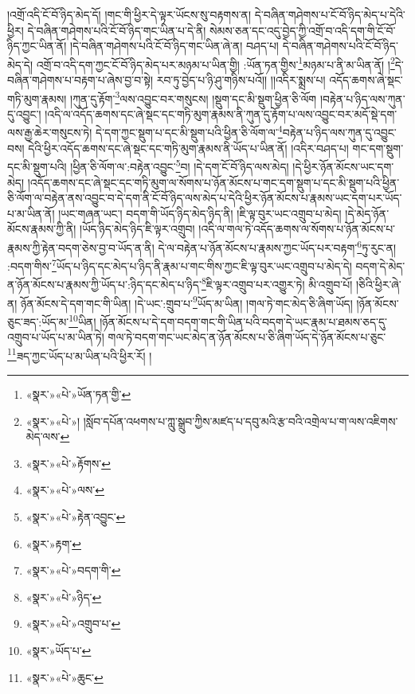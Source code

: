 །འགྲོ་འདི་ངོ་བོ་ཉིད་མེད་དོ། །གང་གི་ཕྱིར་དེ་ལྟར་ཡོངས་སུ་བརྟགས་ན། དེ་བཞིན་གཤེགས་པ་ངོ་བོ་ཉིད་མེད་པ་དེའི་ཕྱིར། དེ་བཞིན་གཤེགས་པའི་ངོ་བོ་ཉིད་གང་ཡིན་པ་དེ་ནི། སེམས་ཅན་དང་འདུ་བྱེད་ཀྱི་འགྲོ་བ་འདི་དག་གི་ངོ་བོ་ཉིད་ཀྱང་ཡིན་ནོ། །དེ་བཞིན་གཤེགས་པའི་ངོ་བོ་ཉིད་གང་ཡིན་ཞེ་ན། བཤད་པ། དེ་བཞིན་གཤེགས་པའི་ངོ་བོ་ཉིད་མེད་དེ། འགྲོ་བ་འདི་དག་ཀྱང་ངོ་བོ་ཉིད་མེད་པར་མཉམ་པ་ཡིན་གྱི། :ཡོན་ཏན་གྱིས་\footnote{«སྣར་»«པེ་»ཡོན་ཏན་གྱི་}མཉམ་པ་ནི་མ་ཡིན་ནོ། །\footnote{«སྣར་»«པེ་»། །སློབ་དཔོན་འཕགས་པ་ཀླུ་སྒྲུབ་ཀྱིས་མཛད་པ་དབུ་མའི་རྩ་བའི་འགྲེལ་པ་ག་ལས་འཇིགས་མེད་ལས་}དེ་བཞིན་གཤེགས་པ་བརྟག་པ་ཞེས་བྱ་བ་སྟེ། རབ་ཏུ་བྱེད་པ་ཉི་ཤུ་གཉིས་པའོ།། །།འདིར་སྨྲས་པ། འདོད་ཆགས་ཞེ་སྡང་གཏི་མུག་རྣམས། །ཀུན་དུ་རྟོག་\footnote{«སྣར་»«པེ་»རྟོགས་}ལས་འབྱུང་བར་གསུངས། །སྡུག་དང་མི་སྡུག་ཕྱིན་ཅི་ལོག །བརྟེན་པ་ཉིད་ལས་ཀུན་དུ་འབྱུང་། །འདི་ལ་འདོད་ཆགས་དང་ཞེ་སྡང་དང་གཏི་མུག་རྣམས་ནི་ཀུན་དུ་རྟོག་པ་ལས་འབྱུང་བར་མདོ་སྡེ་དག་ལས་རྒྱ་ཆེར་གསུངས་ཏེ། དེ་དག་ཀྱང་སྡུག་པ་དང་མི་སྡུག་པའི་ཕྱིན་ཅི་ལོག་ལ་\footnote{«སྣར་»«པེ་»ལས་}བརྟེན་པ་ཉིད་ལས་ཀུན་དུ་འབྱུང་བས། དེའི་ཕྱིར་འདོད་ཆགས་དང་ཞེ་སྡང་དང་གཏི་མུག་རྣམས་ནི་ཡོད་པ་ཡིན་ནོ། །འདིར་བཤད་པ། གང་དག་སྡུག་དང་མི་སྡུག་པའི། །ཕྱིན་ཅི་ལོག་ལ་:བརྟེན་འབྱུང་\footnote{«སྣར་»«པེ་»རྟེན་འབྱུང་}བ། །དེ་དག་ངོ་བོ་ཉིད་ལས་མེད། །དེ་ཕྱིར་ཉོན་མོངས་ཡང་དག་མེད། །འདོད་ཆགས་དང་ཞེ་སྡང་དང་གཏི་མུག་ལ་སོགས་པ་ཉོན་མོངས་པ་གང་དག་སྡུག་པ་དང་མི་སྡུག་པའི་ཕྱིན་ཅི་ལོག་ལ་བརྟེན་ནས་འབྱུང་བ་དེ་དག་ནི་ངོ་བོ་ཉིད་ལས་མེད་པ་དེའི་ཕྱིར་ཉོན་མོངས་པ་རྣམས་ཡང་དག་པར་ཡོད་པ་མ་ཡིན་ནོ། །ཡང་གཞན་ཡང་། བདག་གི་ཡོད་ཉིད་མེད་ཉིད་ནི། །ཇི་ལྟ་བུར་ཡང་འགྲུབ་པ་མེད། །དེ་མེད་ཉོན་མོངས་རྣམས་ཀྱི་ནི། །ཡོད་ཉིད་མེད་ཉིད་ཇི་ལྟར་འགྲུབ། །འདི་ལ་གལ་ཏེ་འདོད་ཆགས་ལ་སོགས་པ་ཉོན་མོངས་པ་རྣམས་ཀྱི་རྟེན་བདག་ཅེས་བྱ་བ་ཡོད་ན་ནི། དེ་ལ་བརྟེན་པ་ཉོན་མོངས་པ་རྣམས་ཀྱང་ཡོད་པར་བརྟག་\footnote{«སྣར་»རྟག་}ཏུ་རུང་ན། :བདག་གིས་\footnote{«སྣར་»«པེ་»བདག་གི་}ཡོད་པ་ཉིད་དང་མེད་པ་ཉིད་ནི་རྣམ་པ་གང་གིས་ཀྱང་ཇི་ལྟ་བུར་ཡང་འགྲུབ་པ་མེད་དེ། བདག་དེ་མེད་ན་ཉོན་མོངས་པ་རྣམས་ཀྱི་ཡོད་པ་:ཉིད་དང་མེད་པ་ཉིད་\footnote{«སྣར་»«པེ་»ཉིད་}ཇི་ལྟར་འགྲུབ་པར་འགྱུར་ཏེ། མི་འགྲུབ་པོ། །ཅིའི་ཕྱིར་ཞེ་ན། ཉོན་མོངས་དེ་དག་གང་གི་ཡིན། །དེ་ཡང་:གྲུབ་པ་\footnote{«སྣར་»«པེ་»འགྲུབ་པ་}ཡོད་མ་ཡིན། །གལ་ཏེ་གང་མེད་ཅི་ཞིག་ཡོད། །ཉོན་མོངས་ཅུང་ཟད་:ཡོད་མ་\footnote{«སྣར་»ཡོད་པ་}ཡིན། །ཉོན་མོངས་པ་དེ་དག་བདག་གང་གི་ཡིན་པའི་བདག་དེ་ཡང་རྣམ་པ་ཐམས་ཅད་དུ་འགྲུབ་པ་ཡོད་པ་མ་ཡིན་ཏེ། གལ་ཏེ་བདག་གང་ཡང་མེད་ན་ཉོན་མོངས་པ་ཅི་ཞིག་ཡོད་དེ་ཉོན་མོངས་པ་ཅུང་\footnote{«སྣར་»«པེ་»ཆུང་}ཟད་ཀྱང་ཡོད་པ་མ་ཡིན་པའི་ཕྱིར་རོ། །
